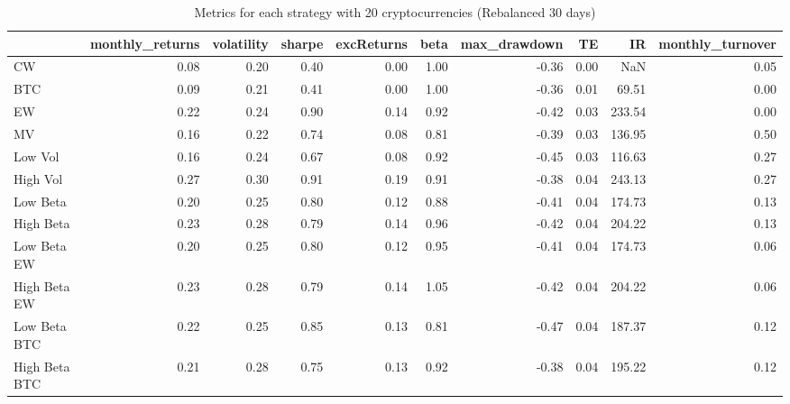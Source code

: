 \begin{table}
\centering
\caption{Metrics for each strategy with 20 cryptocurrencies (Rebalanced 30 days)}
\label{metrics20_30}
\begin{tabular}{lrrrrrrrrr}
\toprule
{} &  monthly\_returns &  volatility &  sharpe &  excReturns &  beta &  max\_drawdown &   TE &     IR &  monthly\_turnover \\
\midrule
CW            &             0.08 &        0.20 &    0.40 &        0.00 &  1.00 &         -0.36 & 0.00 &    NaN &              0.05 \\
BTC           &             0.09 &        0.21 &    0.41 &        0.00 &  1.00 &         -0.36 & 0.01 &  69.51 &              0.00 \\
EW            &             0.22 &        0.24 &    0.90 &        0.14 &  0.92 &         -0.42 & 0.03 & 233.54 &              0.00 \\
MV            &             0.16 &        0.22 &    0.74 &        0.08 &  0.81 &         -0.39 & 0.03 & 136.95 &              0.50 \\
Low Vol       &             0.16 &        0.24 &    0.67 &        0.08 &  0.92 &         -0.45 & 0.03 & 116.63 &              0.27 \\
High Vol      &             0.27 &        0.30 &    0.91 &        0.19 &  0.91 &         -0.38 & 0.04 & 243.13 &              0.27 \\
Low Beta      &             0.20 &        0.25 &    0.80 &        0.12 &  0.88 &         -0.41 & 0.04 & 174.73 &              0.13 \\
High Beta     &             0.23 &        0.28 &    0.79 &        0.14 &  0.96 &         -0.42 & 0.04 & 204.22 &              0.13 \\
Low Beta EW   &             0.20 &        0.25 &    0.80 &        0.12 &  0.95 &         -0.41 & 0.04 & 174.73 &              0.06 \\
High Beta EW  &             0.23 &        0.28 &    0.79 &        0.14 &  1.05 &         -0.42 & 0.04 & 204.22 &              0.06 \\
Low Beta BTC  &             0.22 &        0.25 &    0.85 &        0.13 &  0.81 &         -0.47 & 0.04 & 187.37 &              0.12 \\
High Beta BTC &             0.21 &        0.28 &    0.75 &        0.13 &  0.92 &         -0.38 & 0.04 & 195.22 &              0.12 \\
\bottomrule
\end{tabular}
\end{table}

